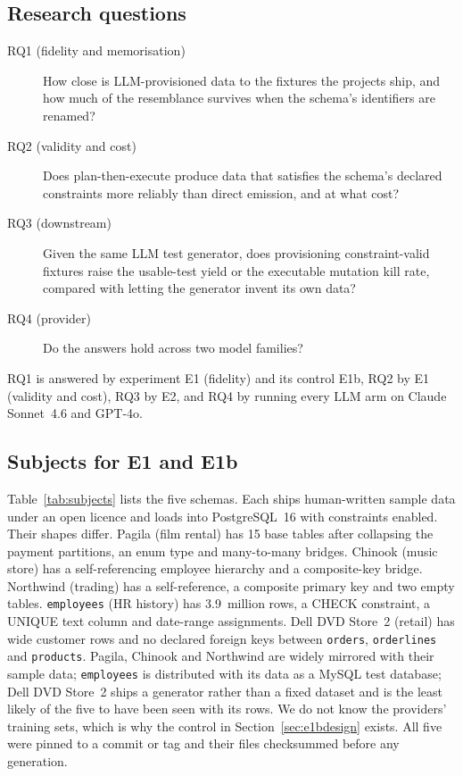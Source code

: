 \documentclass[preprint,12pt]{elsarticle}
\begin{document}
\subsection{Research questions}
\begin{description}
\item[RQ1 (fidelity and memorisation)] How close is LLM-provisioned data to the fixtures the projects ship, and how much of the resemblance survives when the schema's identifiers are renamed?
\item[RQ2 (validity and cost)] Does plan-then-execute produce data that satisfies the schema's declared constraints more reliably than direct emission, and at what cost?
\item[RQ3 (downstream)] Given the same LLM test generator, does provisioning constraint-valid fixtures raise the usable-test yield or the executable mutation kill rate, compared with letting the generator invent its own data?
\item[RQ4 (provider)] Do the answers hold across two model families?
\end{description}
RQ1 is answered by experiment E1 (fidelity) and its control E1b, RQ2 by E1 (validity and cost), RQ3 by E2, and RQ4 by running every LLM arm on Claude Sonnet~4.6 and GPT-4o.

\subsection{Subjects for E1 and E1b}
Table~\ref{tab:subjects} lists the five schemas. Each ships human-written sample data under an open licence and loads into PostgreSQL~16 with constraints enabled. Their shapes differ. Pagila (film rental) has 15 base tables after collapsing the payment partitions, an enum type and many-to-many bridges. Chinook (music store) has a self-referencing employee hierarchy and a composite-key bridge. Northwind (trading) has a self-reference, a composite primary key and two empty tables. \texttt{employees} (HR history) has 3.9~million rows, a CHECK constraint, a UNIQUE text column and date-range assignments. Dell DVD Store~2 (retail) has wide customer rows and no declared foreign keys between \texttt{orders}, \texttt{orderlines} and \texttt{products}. Pagila, Chinook and Northwind are widely mirrored with their sample data; \texttt{employees} is distributed with its data as a MySQL test database; Dell DVD Store~2 ships a generator rather than a fixed dataset and is the least likely of the five to have been seen with its rows. We do not know the providers' training sets, which is why the control in Section~\ref{sec:e1bdesign} exists. All five were pinned to a commit or tag and their files checksummed before any generation.
\end{document}
